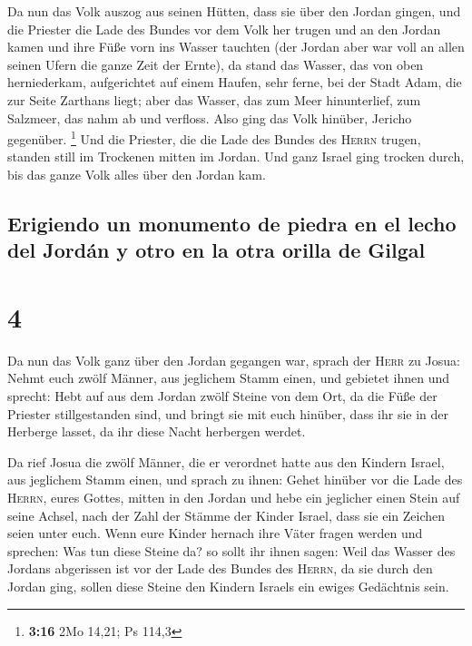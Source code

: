  Da nun das Volk auszog aus seinen Hütten, dass sie über
den Jordan gingen, und die Priester die Lade des Bundes vor dem Volk her
trugen  und an den Jordan kamen und ihre Füße vorn ins
Wasser tauchten (der Jordan aber war voll an allen seinen Ufern die
ganze Zeit der Ernte),  da stand das Wasser, das von oben
herniederkam, aufgerichtet auf einem Haufen, sehr ferne, bei der Stadt
Adam, die zur Seite Zarthans liegt; aber das Wasser, das zum Meer
hinunterlief, zum Salzmeer, das nahm ab und verfloss. Also ging das Volk
hinüber, Jericho gegenüber. \footnote{\textbf{3:16} 2Mo 14,21; Ps 114,3}
 Und die Priester, die die Lade des Bundes des
\textsc{Herrn} trugen, standen still im Trockenen mitten im Jordan. Und
ganz Israel ging trocken durch, bis das ganze Volk alles über den Jordan
kam.

\hypertarget{erigiendo-un-monumento-de-piedra-en-el-lecho-del-jorduxe1n-y-otro-en-la-otra-orilla-de-gilgal}{%
\subsection{Erigiendo un monumento de piedra en el lecho del Jordán y
otro en la otra orilla de
Gilgal}\label{erigiendo-un-monumento-de-piedra-en-el-lecho-del-jorduxe1n-y-otro-en-la-otra-orilla-de-gilgal}}

\hypertarget{section-3}{%
\section{4}\label{section-3}}

 Da nun das Volk ganz über den Jordan gegangen war, sprach
der \textsc{Herr} zu Josua:  Nehmt euch zwölf Männer, aus
jeglichem Stamm einen,  und gebietet ihnen und sprecht:
Hebt auf aus dem Jordan zwölf Steine von dem Ort, da die Füße der
Priester stillgestanden sind, und bringt sie mit euch hinüber, dass ihr
sie in der Herberge lasset, da ihr diese Nacht herbergen werdet.

 Da rief Josua die zwölf Männer, die er verordnet hatte
aus den Kindern Israel, aus jeglichem Stamm einen,  und
sprach zu ihnen: Gehet hinüber vor die Lade des \textsc{Herrn}, eures
Gottes, mitten in den Jordan und hebe ein jeglicher einen Stein auf
seine Achsel, nach der Zahl der Stämme der Kinder Israel, 
dass sie ein Zeichen seien unter euch. Wenn eure Kinder hernach ihre
Väter fragen werden und sprechen: Was tun diese Steine da?
 so sollt ihr ihnen sagen: Weil das Wasser des Jordans
abgerissen ist vor der Lade des Bundes des \textsc{Herrn}, da sie durch
den Jordan ging, sollen diese Steine den Kindern Israels ein ewiges
Gedächtnis sein.

